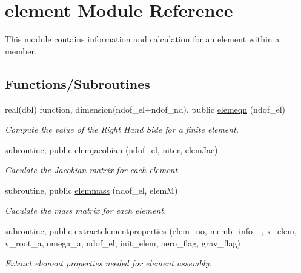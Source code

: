 \hypertarget{namespaceelement}{}\section{element Module Reference}
\label{namespaceelement}


This module contains information and calculation for an element within a member.  


\subsection*{Functions/\+Subroutines}
\begin{DoxyCompactItemize}
\item 
real(dbl) function, dimension(ndof\+\_\+el+ndof\+\_\+nd), public \hyperlink{namespaceelement_a267c29ec99208b5121ba2c6af7180016}{elemeqn} (ndof\+\_\+el)
\begin{DoxyCompactList}\small\item\em Compute the value of the Right Hand Side for a finite element. \end{DoxyCompactList}\item 
subroutine, public \hyperlink{namespaceelement_a172c175acb51f133e8b15a64c6e7f238}{elemjacobian} (ndof\+\_\+el, niter, elem\+Jac)
\begin{DoxyCompactList}\small\item\em Caculate the Jacobian matrix for each element. \end{DoxyCompactList}\item 
subroutine, public \hyperlink{namespaceelement_aeac4f943f8f4e225381fac5a1278d4eb}{elemmass} (ndof\+\_\+el, elemM)
\begin{DoxyCompactList}\small\item\em Caculate the mass matrix for each element. \end{DoxyCompactList}\item 
subroutine, public \hyperlink{namespaceelement_aa0f853882f2705c359567e433bb31fe9}{extractelementproperties} (elem\+\_\+no, memb\+\_\+info\+\_\+i, x\+\_\+elem, v\+\_\+root\+\_\+a, omega\+\_\+a, ndof\+\_\+el, init\+\_\+elem, aero\+\_\+flag, grav\+\_\+flag)
\begin{DoxyCompactList}\small\item\em Extract element properties needed for element assembly. \end{DoxyCompactList}\end{DoxyCompactItemize}
